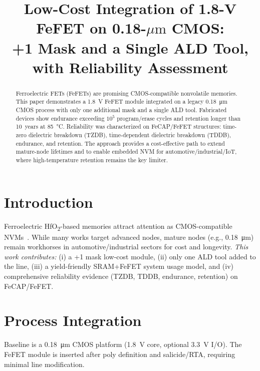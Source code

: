 \documentclass[conference]{IEEEtran}
\newcommand{\um}{\ensuremath{\mu\mathrm{m}}}
\begin{document}
\title{Low-Cost Integration of 1.8-V FeFET on 0.18-\um{} CMOS:\\
\Large +1 Mask and a Single ALD Tool, with Reliability Assessment}

\author{
}

\maketitle

\begin{abstract}
Ferroelectric FETs (FeFETs) are promising CMOS-compatible nonvolatile memories. This paper demonstrates a \SI{1.8}{V} FeFET module integrated on a legacy \SI{0.18}{\micro\meter} CMOS process with only one additional mask and a single ALD tool. Fabricated devices show endurance exceeding $10^{5}$ program/erase cycles and retention longer than 10~years at \SI{85}{\celsius}. Reliability was characterized on FeCAP/FeFET structures: time-zero dielectric breakdown (TZDB), time-dependent dielectric breakdown (TDDB), endurance, and retention. The approach provides a cost-effective path to extend mature-node lifetimes and to enable embedded NVM for automotive/industrial/IoT, where high-temperature retention remains the key limiter.
\end{abstract}

\section{Introduction}
Ferroelectric HfO\textsubscript{2}-based memories attract attention as CMOS-compatible NVMs~\cite{boscke2011,mueller2012,mikolajick2019,mueller2015}. While many works target advanced nodes, mature nodes (e.g., \SI{0.18}{\micro\meter}) remain workhorses in automotive/industrial sectors for cost and longevity. \emph{This work contributes:} (i) a +1 mask low-cost module, (ii) only one ALD tool added to the line, (iii) a yield-friendly SRAM+FeFET system usage model, and (iv) comprehensive reliability evidence (TZDB, TDDB, endurance, retention) on FeCAP/FeFET.

\section{Process Integration}
Baseline is a \SI{0.18}{\micro\meter} CMOS platform (1.8~V core, optional 3.3~V I/O). The FeFET module is inserted after poly definition and salicide/RTA, requiring minimal line modification.
\end{document}
